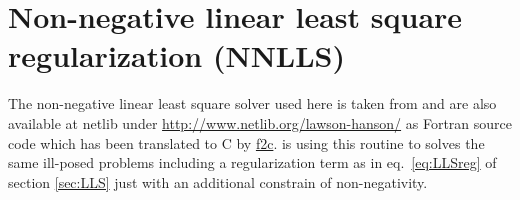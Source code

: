\section{Non-negative linear least square regularization (NNLLS)}\label{sec:NNLLS}
The non-negative linear least square solver used here is taken from \cite{Lawson1995a} and are also available at netlib under
\url{http://www.netlib.org/lawson-hanson/} as Fortran source code which has been translated to C by \hyperref[https://www.netlib.org/f2c/]{f2c}. \SASfit is using this routine to solves the same ill-posed problems including a regularization term as in eq.\ \ref{eq:LLSreg} of section \ref{sec:LLS} just with an additional constrain of non-negativity.

